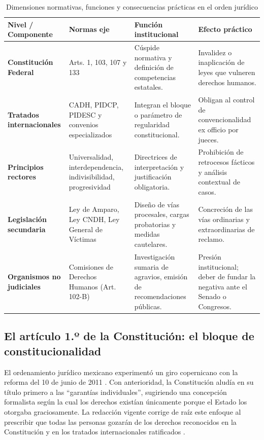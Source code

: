 \documentclass[12pt,spanish,letterpaper,oneside]{article}
\begin{document}
\begin{table}[htbp]
\centering
\caption{Dimensiones normativas, funciones y consecuencias pr\'acticas en el orden jur\'idico}
\label{tab:dimensiones}
\small
\begin{tabularx}{\textwidth}{@{}p{3.0cm}p{3.5cm}Yp{3.2cm}@{}}
\toprule
\textbf{Nivel / Componente} & \textbf{Normas eje} & \textbf{Funci\'on institucional} & \textbf{Efecto pr\'actico} \\
\midrule
\textbf{Constituci\'on Federal} & Arts. 1, 103, 107 y 133 & C\'uspide normativa y definici\'on de competencias estatales. & Invalidez o inaplicaci\'on de leyes que vulneren derechos humanos. \\
\addlinespace
\textbf{Tratados internacionales} & CADH, PIDCP, PIDESC y convenios especializados & Integran el bloque o par\'ametro de regularidad constitucional. & Obligan al control de convencionalidad ex officio por jueces. \\
\addlinespace
\textbf{Principios rectores} & Universalidad, interdependencia, indivisibilidad, progresividad & Directrices de interpretaci\'on y justificaci\'on obligatoria. & Prohibici\'on de retrocesos f\'acticos y an\'alisis contextual de casos. \\
\addlinespace
\textbf{Legislaci\'on secundaria} & Ley de Amparo, Ley CNDH, Ley General de V\'ictimas & Dise\~no de v\'ias procesales, cargas probatorias y medidas cautelares. & Concreci\'on de las v\'ias ordinarias y extraordinarias de reclamo. \\
\addlinespace
\textbf{Organismos no judiciales} & Comisiones de Derechos Humanos (Art. 102-B) & Investigaci\'on sumaria de agravios, emisi\'on de recomendaciones p\'ublicas. & Presi\'on institucional; deber de fundar la negativa ante el Senado o Congresos. \\
\bottomrule
\end{tabularx}
\end{table}

\subsection{El art\'iculo 1.º de la Constituci\'on: el bloque de constitucionalidad}

El ordenamiento jur\'idico mexicano experiment\'o un giro copernicano con la reforma del 10 de junio de 2011 \citep{ibarraCurso2022ADH}. Con anterioridad, la Constituci\'on alud\'ia en su t\'itulo primero a las ``garant\'ias individuales'', sugiriendo una concepci\'on formalista seg\'un la cual los derechos exist\'ian \'unicamente porque el Estado los otorgaba graciosamente. La redacci\'on vigente corrige de ra\'iz este enfoque al prescribir que todas las personas gozar\'an de los derechos reconocidos en la Constituci\'on y en los tratados internacionales ratificados \citep[Art. 1, p\'arr. 1]{cpeumADH2026}.
\end{document}
